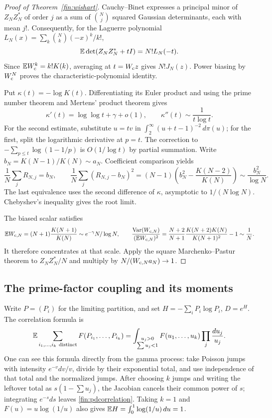 \begin{proof}[Proof of Theorem~\ref{fin:wishart}]
Cauchy--Binet expresses a principal minor of $Z_NZ_N^*$ of order $j$
as a sum of $\binom Nj$ squared Gaussian determinants, each with mean
$j!$.  Consequently, for the Laguerre polynomial
$L_N(x)=\sum_k\binom Nk(-x)^k/k!$,
\[
 \mathbb E\det(Z_NZ_N^*+tI)=N!L_N(-t).
\]
Since $\mathbb E W_{\mathrm c}^k=k!K(k)$, averaging at $t=W_{\mathrm c} z$ gives $N!J_N(z)$.
Power biasing by $W_{\mathrm c}^N$ proves the characteristic-polynomial identity.

Put $\kappa(t)=-\log K(t)$.  Differentiating its Euler product and
using the prime number theorem and Mertens' product theorem gives
\[
 \kappa'(t)=\log\log t+\gamma+o(1),\qquad
 \kappa''(t)\sim\frac1{t\log t}.
\]
For the second estimate, substitute $u=tv$ in
$\int_2^\infty(u+t-1)^{-2}\,d\pi(u)$; for the first, split the
logarithmic derivative at $p=t$.  The correction to
$-\sum_{p\le t}\log(1-1/p)$ is $O(1/\log t)$ by partial summation.
Write $b_N=K(N-1)/K(N)\sim a_N$.  Coefficient comparison yields
\[
 \frac1N\sum_jR_{N,j}=b_N,\qquad
 \frac1N\sum_j(R_{N,j}-b_N)^2
 =(N-1)\left(b_N^2-\frac{K(N-2)}{K(N)}\right)
 \sim\frac{b_N^2}{\log N}.
\]
The last equivalence uses the second difference of $\kappa$, asymptotic
to $1/(N\log N)$.  Chebyshev's inequality gives the root limit.

The biased scalar satisfies
\[
 \mathbb E W_{\mathrm c,N} =(N+1)\frac{K(N+1)}{K(N)}
       \sim e^{-\gamma}N/\log N,\qquad
 \frac{\operatorname{Var}(W_{\mathrm c,N} )}{(\mathbb E W_{\mathrm c,N} )^2}
 =\frac{N+2}{N+1}\frac{K(N+2)K(N)}{K(N+1)^2}-1\sim\frac1N.
\]
It therefore concentrates at that scale.  Apply the square
Marchenko--Pastur theorem \cite{finMarchenkoPastur} to
$Z_NZ_N^*/N$ and multiply by $N/(W_{\mathrm c,N} a_N)\to1$.
\end{proof}

\subsection{The prime-factor coupling and its moments}\label{finapp:entropy-coupling}
Write $P=(P_i)$ for the limiting partition, and set
$H=-\sum_iP_i\log P_i$, $D=e^H$.  The correlation formula
\cite[Theorem 2.1]{finHanda} is
\begin{equation}\label{fin:pdcorrelation}
 \mathbb E\sum_{i_1,\ldots,i_k\ {\rm distinct}}
 F(P_{i_1},\ldots,P_{i_k})
 =
 \int_{\substack{u_j>0\\\sum u_j<1}}
 F(u_1,\ldots,u_k)\prod_j\frac{du_j}{u_j}.
\end{equation}
One can see this formula directly from the gamma process: take Poisson
jumps with intensity $e^{-v}dv/v$, divide by their exponential total,
and use independence of that total and the normalized jumps.
After choosing $k$ jumps and writing the leftover total as
$s(1-\sum u_j)$, the Jacobian cancels their common power of $s$;
integrating $e^{-s}ds$ leaves \eqref{fin:pdcorrelation}.
Taking $k=1$ and $F(u)=u\log(1/u)$ also gives
$\mathbb E H=\int_0^1\log(1/u)\,du=1$.

